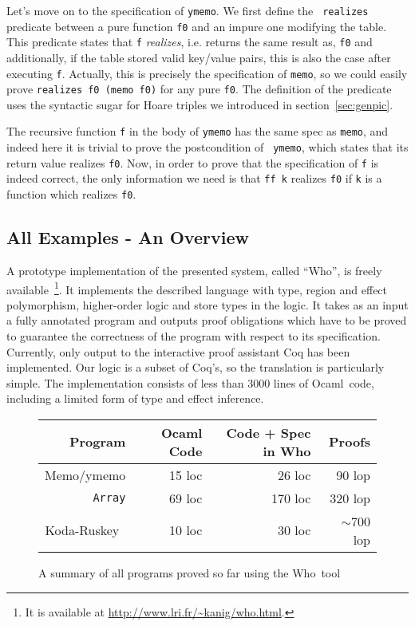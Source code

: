 \documentclass[a4paper]{llncs}
\newcommand{\who}{Who}
\newcommand{\ocaml}{Ocaml}
\begin{document}
Let's move on to the specification of {\tt ymemo}. We first define the {\tt
realizes} predicate between a pure function {\tt f0} and an impure one
modifying the table. This predicate states that {\tt f} {\em realizes}, i.e.
returns the same result as, {\tt f0} and additionally, if the table stored
valid key/value pairs, this is also the case after executing {\tt f}.
Actually, this is precisely the specification of {\tt memo}, so we could
easily prove {\tt realizes f0~(memo f0)} for any pure {\tt f0}. The definition
of the predicate uses the syntactic sugar for Hoare triples we introduced in
section~\ref{sec:genpic}. 

The recursive function {\tt f} in the body of {\tt ymemo} has the same spec as
{\tt memo}, and indeed here it is trivial to prove the postcondition of {\tt
ymemo}, which states that its return value realizes {\tt f0}. Now, in order to
prove that the specification of {\tt f} is indeed correct, the only
information we need is that {\tt ff k} realizes {\tt f0} if {\tt k} is a
function which realizes {\tt f0}.

\subsection{All Examples - An Overview}

A prototype implementation of the presented system, called ``\who'', is freely
available~\cite{KanigFilliatre09wml}\footnote{It is available at
\url{http://www.lri.fr/~kanig/who.html}.}. It implements the described
language with type, region and effect polymorphism, higher-order logic and
store types in the logic. It takes as an input a fully annotated program and
outputs proof obligations which have to be proved to guarantee the correctness
of the program with respect to its specification. Currently, only output to
the interactive proof assistant Coq has been implemented. Our logic is a
subset of Coq's, so the translation is particularly simple.  The
implementation consists of less than 3000 lines of \ocaml\ code, including a
limited form of type and effect inference.

\begin{figure}[tbp]
\begin{center}
    \begin{tabular}{ | r | r | r | r |}
    \hline
    Program & Ocaml Code & Code + Spec in \who & Proofs \\ \hline
    Memo/ymemo & 15 loc & 26 loc & 90 lop  \\ \hline
    {\tt Array} & 69 loc & 170 loc  & 320 lop  \\ \hline
    Koda-Ruskey~\cite{KanigFilliatre09wml} & 10 loc & 30 loc & $\sim$700 lop  \\ \hline
    \end{tabular}
\end{center}
  \caption{A summary of all programs proved so far using the \who\ tool}
  \label{fig:whoproofs}
\end{figure}
\end{document}
